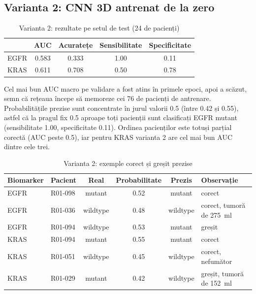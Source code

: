 \documentclass[runningheads,a4paper,11pt]{report}
\begin{document}
\subsection{Varianta 2: CNN 3D antrenat de la zero}
\begin{table}[htbp]
    \centering
    \begin{tabular}{lcccc}
        \toprule
        & \textbf{AUC} & \textbf{Acuratețe} & \textbf{Sensibilitate} & \textbf{Specificitate} \\
        \midrule
        EGFR & 0.583 & 0.333 & 1.00 & 0.11 \\
        KRAS & 0.611 & 0.708 & 0.50 & 0.78 \\
        \bottomrule
    \end{tabular}
    \caption{Varianta 2: rezultate pe setul de test (24 de pacienți)}
    \label{tab:rez_v2}
\end{table}

Cel mai bun AUC macro pe validare a fost atins în primele epoci, apoi a scăzut, semn că rețeaua începe să memoreze cei 76 de pacienți de antrenare. Probabilitățile prezise sunt concentrate în jurul valorii 0.5 (între 0.42 și 0.55), astfel că la pragul fix 0.5 aproape toți pacienții sunt clasificați EGFR mutant (sensibilitate 1.00, specificitate 0.11). Ordinea pacienților este totuși parțial corectă (AUC peste 0.5), iar pentru KRAS varianta 2 are cel mai bun AUC dintre cele trei.

\begin{table}[htbp]
    \centering
    \begin{tabular}{llcccl}
        \toprule
        \textbf{Biomarker} & \textbf{Pacient} & \textbf{Real} & \textbf{Probabilitate} & \textbf{Prezis} & \textbf{Observație} \\
        \midrule
        EGFR & R01-098 & mutant & 0.52 & mutant & corect \\
        EGFR & R01-036 & wildtype & 0.48 & wildtype & corect, tumoră de 275~ml \\
        EGFR & R01-094 & wildtype & 0.53 & mutant & greșit \\
        KRAS & R01-094 & mutant & 0.55 & mutant & corect \\
        KRAS & R01-051 & wildtype & 0.45 & wildtype & corect, nefumător \\
        KRAS & R01-029 & mutant & 0.42 & wildtype & greșit, tumoră de 152~ml \\
        \bottomrule
    \end{tabular}
    \caption{Varianta 2: exemple corect și greșit prezise}
    \label{tab:ex_v2}
\end{table}
\end{document}
